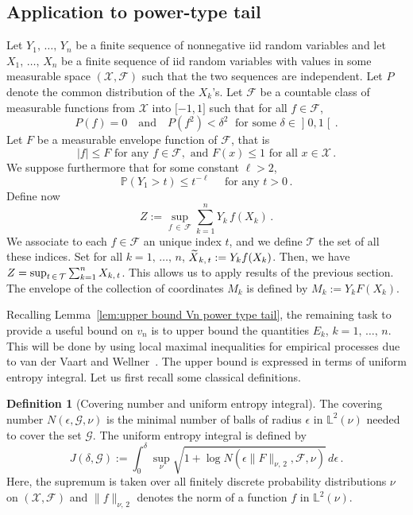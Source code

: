 \documentclass[10pt]{amsart}
\theoremstyle{definition}\newtheorem{defi}[theo]{Definition}\newtheorem{rema}[theo]{Remark}\newtheorem{exam}[theo]{Example}\newtheorem{exem}[theo]{Example}\newtheorem{nota}[theo]{Notation}
\newcommand{\bL}{\mathbb{L}}
\newcommand{\bP}{\mathbb{P}}
\newcommand{\cF}{\mathcal{F}}
\newcommand{\cT}{\mathcal{T}}
\newcommand{\cX}{\mathcal{X}}
\newcommand{\caF}{\mathscr{F}}
\newcommand{\caG}{\mathscr{G}}
\newcommand{\intervalleoo}[2]{\mathopen{]} #1\mathclose{}\mathpunct{},#2\mathclose{[}}
\newcommand{\intervalleff}[2]{\mathopen{[} #1\mathclose{}\mathpunct{},#2\mathclose{]}}
\let\oldtilde\tilde
\renewcommand*{\tilde}[1]{\mathchoice{\widetilde{#1}}{\widetilde{#1}}{\oldtilde{#1}}{\oldtilde{#1}}}
\begin{document}
\subsection{Application to power-type tail}
Let $Y_1,\,\ldots,\,Y_n$ be a finite sequence of nonnegative iid random variables and let $X_1,\,\ldots,\,X_n$ be a finite sequence of iid random variables with values in some measurable space $(\cX,\cF)$ such that the two sequences are independent. Let $P$ denote the common distribution of the $X_k$'s. Let $\caF$ be a countable class of measurable functions from $\cX$ into $\intervalleff{-1}{1}$ such that for all $f\in\caF$,
\begin{equation}\label{eqn:prop caF power type tail}
P(f)=0\quad \text{and}\quad P(f^2)< \delta^2\;\text{ for some }\delta\in \intervalleoo 01\,.
\end{equation}
Let $F$ be a measurable envelope function of $\caF$, that is
\begin{equation}\label{eqn:def envelope power type tail}
|f|\leq F\text{ for any }f\in\caF,\text{ and } F(x)\leq 1\text{ for all }x\in\cX\,.
\end{equation}
We suppose furthermore that for some constant $\ell>2$,
\begin{equation}\label{eqn:hyp envelope power type tail}
\bP(Y_1>t)\leq t^{-\ell}\quad\text{ for any }t>0\,.
\end{equation}
Define now
\begin{equation}\label{eqn:def Z power type tail}
Z:= \sup_{f\,\in\,\caF}\sum_{k=1}^nY_k\,f(X_k)\,.
\end{equation}
We associate to each $f\in\caF$ an unique index $t$, and we define $\cT$ the set of all these indices. Set for all $k=1,\,\ldots,\,n$, $\tilde X_{k,\,t}:=Y_kf(X_k)$. Then, we have $Z=\sup_{t\,\in\,\cT}\linebreak\sum_{k=1}^n X_{k,\,t}$. This allows us to apply results of the previous section. The envelope of the collection of coordinates $M_k$ is defined by $M_k:=Y_kF(X_k)$.

Recalling Lemma~\ref{lem:upper bound Vn power type tail}, the remaining task to provide a useful bound on $v_n$ is to upper bound the quantities $E_k$, $k=1,\,\ldots,\,n$. This will be done by using local maximal inequalities for empirical processes due to van der Vaart and Wellner~\cite[Theorem~2.1]{vdVW11}. The upper bound is expressed in terms of uniform entropy integral. Let us first recall some classical definitions.

\begin{defi}[Covering number and uniform entropy integral]
The covering number $N(\epsilon,\caG, \nu)$ is the minimal number of balls of radius $\epsilon$ in $\bL^2(\nu)$ needed to cover the set $\caG$. The uniform entropy integral is defined by
\[
J(\delta,\caG):=\int_0^\delta\sup_\nu\sqrt{1+\log N\left(\epsilon\|F\|_{\nu,\,2},\caF, \nu\right)}\,d\epsilon\,.
\]
Here, the supremum is taken over all finitely discrete probability distributions $\nu$ on $(\cX,\cF)$ and $\|f\|_{\nu,\,2}$ denotes the norm of a function $f$ in $\bL^2(\nu)$.
\end{defi}
\end{document}
